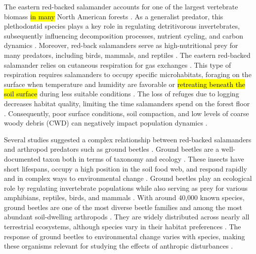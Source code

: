 The eastern red-backed salamander accounts for one of the largest vertebrate biomass \hl{in many} North American forests \citep{Burton1975Salamanderpopulations,Petranka1993Effectstimber,semlitschAbundanceBiomassProduction2014a}. 
As a generalist predator, this plethodontid species plays a key role in regulating detritivorous invertebrates, subsequently influencing decomposition processes, nutrient cycling, and carbon dynamics \citep{Burton1975Energyflow,Wyman1998Experimentalassessment,Walton2013Topdownregulation,Hickerson2017Easternredbacked}. 
Moreover, red-back salamanders serve as high-nutritional prey for many predators, including birds, mammals, and reptiles \citep{Burton1975Energyflow,Pough1987abundancesalamanders}. 
The eastern red-backed salamander relies on cutaneous respiration for gas exchanges \citep{Heatwole1961Relationsubstrate}. 
This type of respiration requires salamanders to occupy specific microhabitats, foraging on the surface when temperature and humidity are favorable or \hl{retreating beneath the soil surface} during less suitable conditions \citep{Grizzell1949HibernationSite,FraserEmpiricalEvaluation1976,Jaeger1980MicrohabitatsTerrestrial}. 
The loss of refuges due to logging decreases habitat quality, limiting the time salamanders spend on the forest floor \citep{Achat2015Quantifyingconsequences,Peele2017Effectswoody}. 
Consequently, poor surface conditions, soil compaction, and low levels of coarse woody debris (CWD) can negatively impact population dynamics \citep{Peterman2014Spatialvariation}. 

Several studies suggested a complex relationship between red-backed salamanders and arthropod predators such as ground beetles \citep{Gall2003BehavioralInteractions,Walton2006Salamandersforestfloor,Hickerson2018Behavioralinteractions}. 
Ground beetles are a well-documented taxon both in terms of taxonomy and ecology \citep{loveiEcologyBehaviorGround1996}. 
These insects have short lifespans, occupy a high position in the soil food web, and respond rapidly and in complex ways to environmental change \citep{loveiEcologyBehaviorGround1996}. 
Ground beetles play an ecological role by regulating invertebrate populations while also serving as prey for various amphibians, reptiles, birds, and mammals \citep{loveiEcologyBehaviorGround1996}. 
With around 40,000 known species, ground beetles are one of the most diverse beetle families and among the most abundant soil-dwelling arthropods \citep{Erwin1985taxonpulse,loveiEcologyBehaviorGround1996,Rochefort2006GroundBeetle}. 
They are widely distributed across nearly all terrestrial ecosystems, although species vary in their habitat preferences \citep{loveiEcologyBehaviorGround1996,kotzeFortyYearsCarabid2011a,Larochelle2003naturalhistory}. 
The response of ground beetles to environmental change varies with species, making these organisms relevant for studying the effects of anthropic disturbances \citep{Rainio2003Groundbeetles}. 

